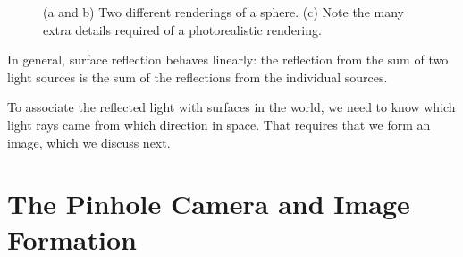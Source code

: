 \begin{figure}[t]
\centerline{
}
\caption{(a and b) Two different renderings of a sphere.  (c) Note the many extra details required of a photorealistic rendering.}
\label{fig:rendering}
\end{figure}


In general, surface reflection behaves
linearly:  the reflection from the sum of two light sources is the sum of the
reflections from the individual sources. 

To associate the reflected light with surfaces in the world, we need to know which light rays came from which direction in space.  That requires that we form an image, which we discuss next.



\section{The Pinhole Camera and Image Formation}
\label{sec:pinhole_camera_formation}

